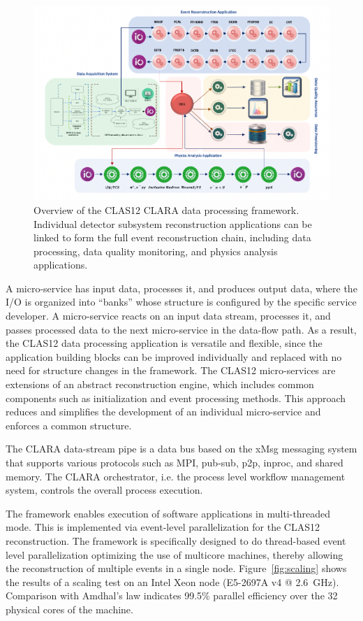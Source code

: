 \begin{figure}[t]
\centering
\includegraphics[width=1.0\textwidth]{pics/clara-overview.pdf}
\caption{Overview of the CLAS12 CLARA data processing framework.  Individual detector subsystem
  reconstruction applications can be linked to form the full event reconstruction chain, including  data processing,
  data quality monitoring, and physics analysis applications.}
\label{fig:clara-overview}
\end{figure}

A micro-service has input data, processes it, and produces output data, where the I/O is organized into ``banks''
whose structure is configured by the specific service developer.  A micro-service reacts on an input data stream,
processes it, and passes processed data to the next micro-service in the data-flow path.  As a result, the CLAS12
data processing application is versatile and flexible, since the application building blocks can be improved individually
and replaced with no need for structure changes in the framework. The CLAS12 micro-services are extensions of an
abstract reconstruction engine, which includes common components such as initialization and event processing
methods. This approach reduces and simplifies the development of an individual micro-service and enforces a common
structure. 

The CLARA data-stream pipe is a data bus based on the xMsg messaging system that supports various protocols
such as MPI, pub-sub, p2p, inproc, and shared memory. The CLARA orchestrator, i.e. the process level workflow
management system, controls the overall process execution. 

The framework enables execution of software applications in multi-threaded mode. This is implemented via event-level
parallelization for the CLAS12 reconstruction. 
The framework is specifically designed to do thread-based event level
parallelization optimizing the use of multicore machines, thereby allowing 
the reconstruction of multiple events in a single node.  
Figure~\ref{fig:scaling} shows the results of a scaling test on an
Intel Xeon node (E5-2697A v4 @ 2.6~GHz). Comparison with Amdhal's law indicates 99.5\% parallel efficiency over
the 32 physical cores of the machine.

